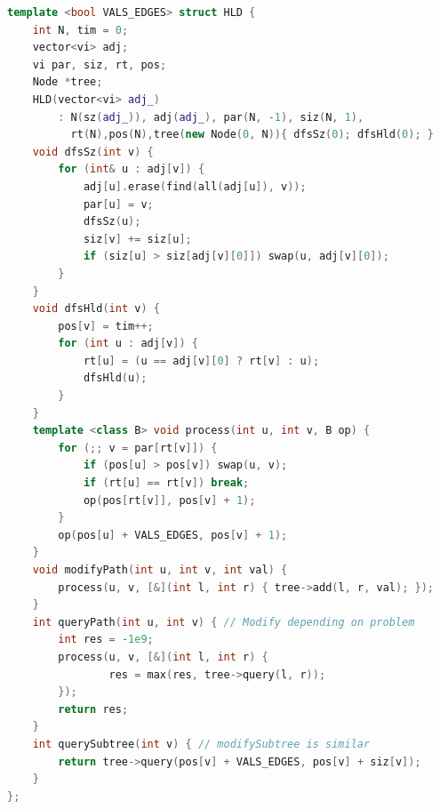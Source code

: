\begin{multicols}{\Columns}
\begin{lstlisting}[language=C++]
template <bool VALS_EDGES> struct HLD {
	int N, tim = 0;
	vector<vi> adj;
	vi par, siz, rt, pos;
	Node *tree;
	HLD(vector<vi> adj_)
		: N(sz(adj_)), adj(adj_), par(N, -1), siz(N, 1),
		  rt(N),pos(N),tree(new Node(0, N)){ dfsSz(0); dfsHld(0); }
	void dfsSz(int v) {
		for (int& u : adj[v]) {
			adj[u].erase(find(all(adj[u]), v));
			par[u] = v;
			dfsSz(u);
			siz[v] += siz[u];
			if (siz[u] > siz[adj[v][0]]) swap(u, adj[v][0]);
		}
	}
	void dfsHld(int v) {
		pos[v] = tim++;
		for (int u : adj[v]) {
			rt[u] = (u == adj[v][0] ? rt[v] : u);
			dfsHld(u);
		}
	}
	template <class B> void process(int u, int v, B op) {
		for (;; v = par[rt[v]]) {
			if (pos[u] > pos[v]) swap(u, v);
			if (rt[u] == rt[v]) break;
			op(pos[rt[v]], pos[v] + 1);
		}
		op(pos[u] + VALS_EDGES, pos[v] + 1);
	}
	void modifyPath(int u, int v, int val) {
		process(u, v, [&](int l, int r) { tree->add(l, r, val); });
	}
	int queryPath(int u, int v) { // Modify depending on problem
		int res = -1e9;
		process(u, v, [&](int l, int r) {
				res = max(res, tree->query(l, r));
		});
		return res;
	}
	int querySubtree(int v) { // modifySubtree is similar
		return tree->query(pos[v] + VALS_EDGES, pos[v] + siz[v]);
	}
};
\end{lstlisting}


\end{multicols}
